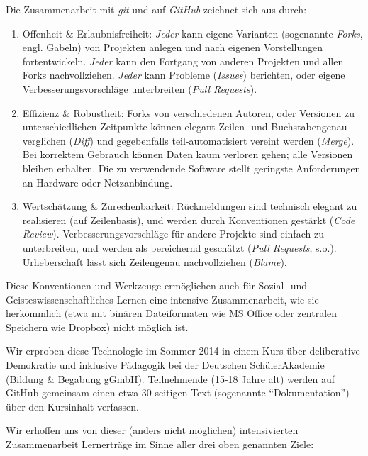 \documentclass[11pt,a4paper,oneside]{article}
\begin{document}
Die Zusammenarbeit mit \emph{git} und auf \emph{GitHub} zeichnet sich aus durch:
\begin{enumerate}
	\item Offenheit & Erlaubnisfreiheit:
		\emph{Jeder} kann eigene Varianten (sogenannte \emph{Forks}, engl. Gabeln) von Projekten anlegen und nach eigenen Vorstellungen fortentwickeln.
		\emph{Jeder} kann den Fortgang von anderen Projekten und allen Forks nachvollziehen.
		\emph{Jeder} kann Probleme (\emph{Issues}) berichten, oder eigene Verbesserungsvorschläge unterbreiten (\emph{Pull Requests}).
	\item Effizienz & Robustheit:
		Forks von verschiedenen Autoren, oder Versionen zu unterschiedlichen Zeitpunkte können elegant Zeilen- und Buchstabengenau verglichen (\emph{Diff}) und gegebenfalls teil-automatisiert vereint werden (\emph{Merge}).
		Bei korrektem Gebrauch können Daten kaum verloren gehen; alle Versionen bleiben erhalten.
		Die zu verwendende Software stellt geringste Anforderungen an Hardware oder Netzanbindung.
	\item Wertschätzung & Zurechenbarkeit:
		Rückmeldungen sind technisch elegant zu realisieren (auf Zeilenbasis), und werden durch Konventionen gestärkt (\emph{Code Review}).
		Verbesserungsvorschläge für andere Projekte sind einfach zu unterbreiten, und werden als bereichernd geschätzt (\emph{Pull Requests}, s.o.).
		Urheberschaft lässt sich Zeilengenau nachvollziehen (\emph{Blame}).
\end{enumerate}

Diese Konventionen und Werkzeuge ermöglichen auch für Sozial- und Geisteswissenschaftliches Lernen eine intensive Zusammenarbeit, wie sie herkömmlich (etwa mit binären Dateiformaten wie MS Office oder zentralen Speichern wie Dropbox) nicht möglich ist.

Wir erproben diese Technologie im Sommer 2014 in einem Kurs über deliberative Demokratie und inklusive Pädagogik bei der Deutschen SchülerAkademie (Bildung & Begabung gGmbH).
Teilnehmende (15-18 Jahre alt) werden auf GitHub gemeinsam einen etwa 30-seitigen Text (sogenannte ``Dokumentation'') über den Kursinhalt verfassen.

Wir erhoffen uns von dieser (anders nicht möglichen) intensivierten Zusammenarbeit Lernerträge im Sinne aller drei oben genannten Ziele:

\end{document}
